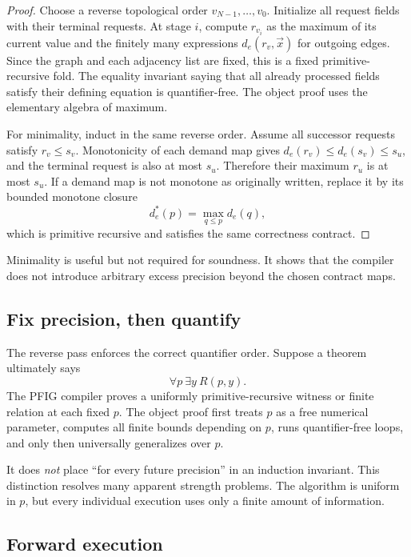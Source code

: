\begin{proof}
Choose a reverse topological order \(v_{N-1},\ldots,v_0\).  Initialize all request fields with their terminal requests.  At stage \(i\), compute \(r_{v_i}\) as the maximum of its current value and the finitely many expressions \(d_e(r_v,\vec{x})\) for outgoing edges.  Since the graph and each adjacency list are fixed, this is a fixed primitive-recursive fold.  The equality invariant saying that all already processed fields satisfy their defining equation is quantifier-free.  The object proof uses the elementary algebra of maximum.

For minimality, induct in the same reverse order.  Assume all successor requests satisfy \(r_v\le s_v\).  Monotonicity of each demand map gives
\(d_e(r_v)\le d_e(s_v)\le s_u\), and the terminal request is also at most \(s_u\).  Therefore their maximum \(r_u\) is at most \(s_u\).  If a demand map is not monotone as originally written, replace it by its bounded monotone closure
\[
 d_e^*(p)=\max_{q\le p}d_e(q),
\]
which is primitive recursive and satisfies the same correctness contract.
\end{proof}

Minimality is useful but not required for soundness.  It shows that the compiler does not introduce arbitrary excess precision beyond the chosen contract maps.

\subsection{Fix precision, then quantify}

The reverse pass enforces the correct quantifier order.  Suppose a theorem ultimately says
\[
 \forall p\ \exists y\ R(p,y).
\]
The PFIG compiler proves a uniformly primitive-recursive witness or finite relation at each fixed \(p\).  The object proof first treats \(p\) as a free numerical parameter, computes all finite bounds depending on \(p\), runs quantifier-free loops, and only then universally generalizes over \(p\).

It does \emph{not} place ``for every future precision'' in an induction invariant.  This distinction resolves many apparent strength problems.  The algorithm is uniform in \(p\), but every individual execution uses only a finite amount of information.

\subsection{Forward execution}

